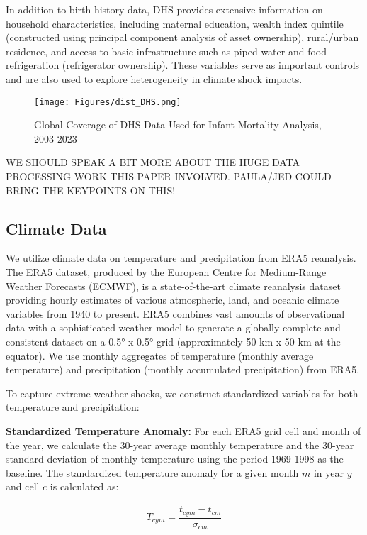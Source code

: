 \documentclass[a4paper]{article}
\begin{document}
In addition to birth history data, DHS provides extensive information on household characteristics, including maternal education, wealth index quintile (constructed using principal component analysis of asset ownership), rural/urban residence, and access to basic infrastructure such as piped water and food refrigeration (refrigerator ownership). These variables serve as important controls and are also used to explore heterogeneity in climate shock impacts.


\begin{figure}[t!]
    \centering
    \caption{Global Coverage of DHS Data Used for Infant Mortality Analysis, 2003-2023}
    \label{fig:distr_DHS}
    \texttt{[image: Figures/dist\_DHS.png]}
\end{figure}

WE SHOULD SPEAK A BIT MORE ABOUT THE HUGE DATA PROCESSING WORK THIS PAPER INVOLVED. PAULA/JED COULD BRING THE KEYPOINTS ON THIS!

\subsection{Climate Data}

We utilize climate data on temperature and precipitation from ERA5 reanalysis. The ERA5 dataset, produced by the European Centre for Medium-Range Weather Forecasts (ECMWF), is a state-of-the-art climate reanalysis dataset providing hourly estimates of various atmospheric, land, and oceanic climate variables from 1940 to present. ERA5 combines vast amounts of observational data with a sophisticated weather model to generate a globally complete and consistent dataset on a 0.5° x 0.5° grid (approximately 50 km x 50 km at the equator). We use monthly aggregates of temperature (monthly average temperature) and precipitation (monthly accumulated precipitation) from ERA5.

To capture extreme weather shocks, we construct standardized variables for both temperature and precipitation:

\textbf{Standardized Temperature Anomaly:} For each ERA5 grid cell and month of the year, we calculate the 30-year average monthly temperature and the 30-year standard deviation of monthly temperature using the period 1969-1998 as the baseline.  The standardized temperature anomaly for a given month \(m\) in year \(y\) and cell \(c\) is calculated as:

\[ T_{cym} = \frac{t_{cym} - \overline{t}_{cm}}{\sigma_{cm}} \]
\end{document}
